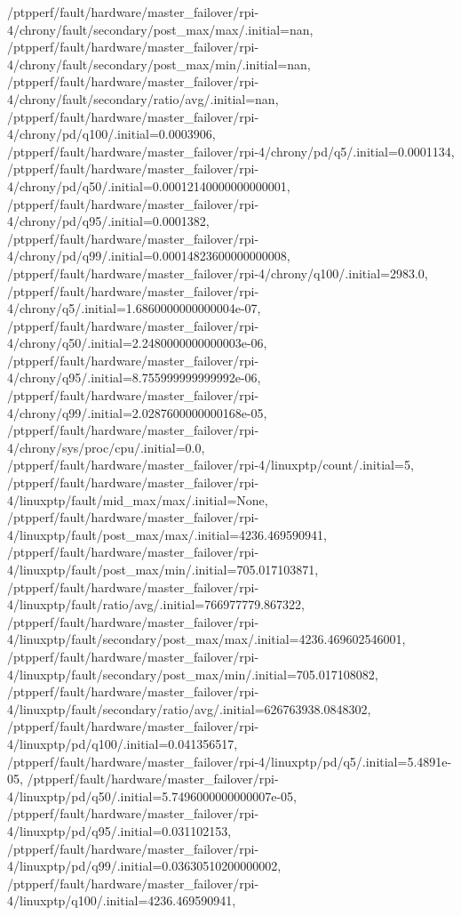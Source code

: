 {    /ptpperf/fault/hardware/master_failover/rpi-4/chrony/fault/secondary/post_max/max/.initial=nan,
    /ptpperf/fault/hardware/master_failover/rpi-4/chrony/fault/secondary/post_max/min/.initial=nan,
    /ptpperf/fault/hardware/master_failover/rpi-4/chrony/fault/secondary/ratio/avg/.initial=nan,
    /ptpperf/fault/hardware/master_failover/rpi-4/chrony/pd/q100/.initial=0.0003906,
    /ptpperf/fault/hardware/master_failover/rpi-4/chrony/pd/q5/.initial=0.0001134,
    /ptpperf/fault/hardware/master_failover/rpi-4/chrony/pd/q50/.initial=0.00012140000000000001,
    /ptpperf/fault/hardware/master_failover/rpi-4/chrony/pd/q95/.initial=0.0001382,
    /ptpperf/fault/hardware/master_failover/rpi-4/chrony/pd/q99/.initial=0.00014823600000000008,
    /ptpperf/fault/hardware/master_failover/rpi-4/chrony/q100/.initial=2983.0,
    /ptpperf/fault/hardware/master_failover/rpi-4/chrony/q5/.initial=1.6860000000000004e-07,
    /ptpperf/fault/hardware/master_failover/rpi-4/chrony/q50/.initial=2.2480000000000003e-06,
    /ptpperf/fault/hardware/master_failover/rpi-4/chrony/q95/.initial=8.755999999999992e-06,
    /ptpperf/fault/hardware/master_failover/rpi-4/chrony/q99/.initial=2.0287600000000168e-05,
    /ptpperf/fault/hardware/master_failover/rpi-4/chrony/sys/proc/cpu/.initial=0.0,
    /ptpperf/fault/hardware/master_failover/rpi-4/linuxptp/count/.initial=5,
    /ptpperf/fault/hardware/master_failover/rpi-4/linuxptp/fault/mid_max/max/.initial=None,
    /ptpperf/fault/hardware/master_failover/rpi-4/linuxptp/fault/post_max/max/.initial=4236.469590941,
    /ptpperf/fault/hardware/master_failover/rpi-4/linuxptp/fault/post_max/min/.initial=705.017103871,
    /ptpperf/fault/hardware/master_failover/rpi-4/linuxptp/fault/ratio/avg/.initial=766977779.867322,
    /ptpperf/fault/hardware/master_failover/rpi-4/linuxptp/fault/secondary/post_max/max/.initial=4236.469602546001,
    /ptpperf/fault/hardware/master_failover/rpi-4/linuxptp/fault/secondary/post_max/min/.initial=705.017108082,
    /ptpperf/fault/hardware/master_failover/rpi-4/linuxptp/fault/secondary/ratio/avg/.initial=626763938.0848302,
    /ptpperf/fault/hardware/master_failover/rpi-4/linuxptp/pd/q100/.initial=0.041356517,
    /ptpperf/fault/hardware/master_failover/rpi-4/linuxptp/pd/q5/.initial=5.4891e-05,
    /ptpperf/fault/hardware/master_failover/rpi-4/linuxptp/pd/q50/.initial=5.7496000000000007e-05,
    /ptpperf/fault/hardware/master_failover/rpi-4/linuxptp/pd/q95/.initial=0.031102153,
    /ptpperf/fault/hardware/master_failover/rpi-4/linuxptp/pd/q99/.initial=0.03630510200000002,
    /ptpperf/fault/hardware/master_failover/rpi-4/linuxptp/q100/.initial=4236.469590941,
}
